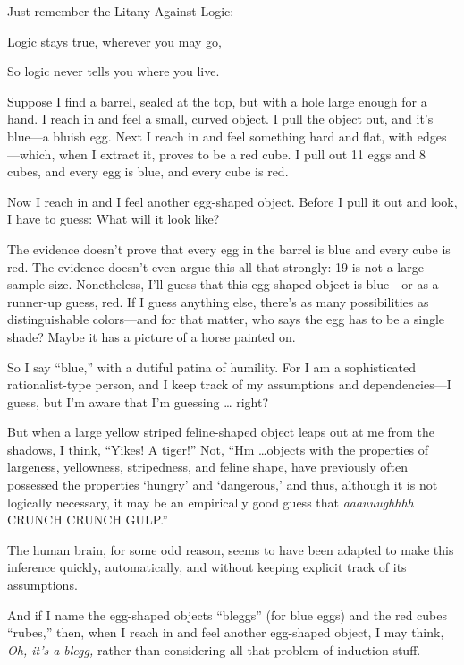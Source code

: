 {
 Just remember the Litany Against Logic:}

{
 Logic stays true, wherever you may go,}

{
 So logic never tells you where you live.}

\myendsectiontext


{
 Suppose I find a barrel, sealed at the top, but with a hole large
enough for a hand. I reach in and feel a small, curved object. I pull
the object out, and it's blue---a bluish egg. Next I
reach in and feel something hard and flat, with edges---which, when I
extract it, proves to be a red cube. I pull out 11 eggs and 8 cubes,
and every egg is blue, and every cube is red. }

{
 Now I reach in and I feel another egg-shaped object. Before I pull
it out and look, I have to guess: What will it look like?}

{
 The evidence doesn't prove that every egg in the
barrel is blue and every cube is red. The evidence
doesn't even argue this all that strongly: 19 is not a
large sample size. Nonetheless, I'll guess that this
egg-shaped object is blue---or as a runner-up guess, red. If I guess
anything else, there's as many possibilities as
distinguishable colors---and for that matter, who says the egg has to
be a single shade? Maybe it has a picture of a horse painted on.}

{
 So I say ``blue,'' with a
dutiful patina of humility. For I am a sophisticated rationalist-type
person, and I keep track of my assumptions and dependencies---I guess,
but I'm aware that I'm guessing \ldots
right?}

{
 But when a large yellow striped feline-shaped object leaps out at
me from the shadows, I think, ``Yikes! A
tiger!'' Not, ``Hm \ldots objects
with the properties of largeness, yellowness, stripedness, and feline
shape, have previously often possessed the properties
`hungry' and
`dangerous,' and thus, although it is
not logically necessary, it may be an empirically good guess that
\textit{aaauuughhhh} CRUNCH CRUNCH GULP.''}

{
 The human brain, for some odd reason, seems to have been adapted
to make this inference quickly, automatically, and without keeping
explicit track of its assumptions.}

{
 And if I name the egg-shaped objects
``bleggs'' (for blue eggs) and the
red cubes ``rubes,'' then, when I
reach in and feel another egg-shaped object, I may think, \textit{Oh,
it's a blegg,} rather than considering all that
problem-of-induction stuff.}

